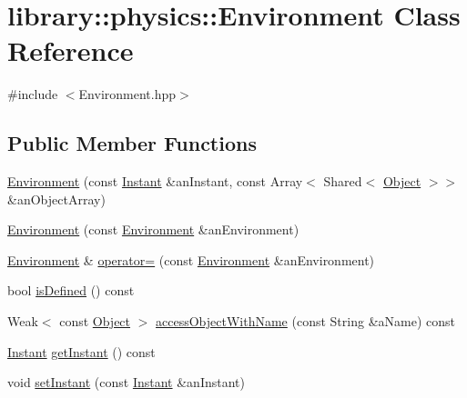 \hypertarget{classlibrary_1_1physics_1_1_environment}{}\section{library\+:\+:physics\+:\+:Environment Class Reference}
\label{classlibrary_1_1physics_1_1_environment}


{\ttfamily \#include $<$Environment.\+hpp$>$}

\subsection*{Public Member Functions}
\begin{DoxyCompactItemize}
\item 
\hyperlink{classlibrary_1_1physics_1_1_environment_a51854f130c31eb075ea623e332978495}{Environment} (const \hyperlink{classlibrary_1_1physics_1_1time_1_1_instant}{Instant} \&an\+Instant, const Array$<$ Shared$<$ \hyperlink{classlibrary_1_1physics_1_1env_1_1_object}{Object} $>$$>$ \&an\+Object\+Array)
\item 
\hyperlink{classlibrary_1_1physics_1_1_environment_afb2fe03dcd7061a8ed5e155d7d134ba2}{Environment} (const \hyperlink{classlibrary_1_1physics_1_1_environment}{Environment} \&an\+Environment)
\item 
\hyperlink{classlibrary_1_1physics_1_1_environment}{Environment} \& \hyperlink{classlibrary_1_1physics_1_1_environment_a3410b331642161ad087d76b7d5019a86}{operator=} (const \hyperlink{classlibrary_1_1physics_1_1_environment}{Environment} \&an\+Environment)
\item 
bool \hyperlink{classlibrary_1_1physics_1_1_environment_acbe2e199328ec6a3d2c233dbe8eb6359}{is\+Defined} () const
\item 
Weak$<$ const \hyperlink{classlibrary_1_1physics_1_1env_1_1_object}{Object} $>$ \hyperlink{classlibrary_1_1physics_1_1_environment_a86e1c1b5f7e7364610faf35491e2613a}{access\+Object\+With\+Name} (const String \&a\+Name) const
\item 
\hyperlink{classlibrary_1_1physics_1_1time_1_1_instant}{Instant} \hyperlink{classlibrary_1_1physics_1_1_environment_a551ca61eb2aebd762e67b7c9e561d22e}{get\+Instant} () const
\item 
void \hyperlink{classlibrary_1_1physics_1_1_environment_a6279d44965a3894993cee2bc0c51d068}{set\+Instant} (const \hyperlink{classlibrary_1_1physics_1_1time_1_1_instant}{Instant} \&an\+Instant)
\end{DoxyCompactItemize}
